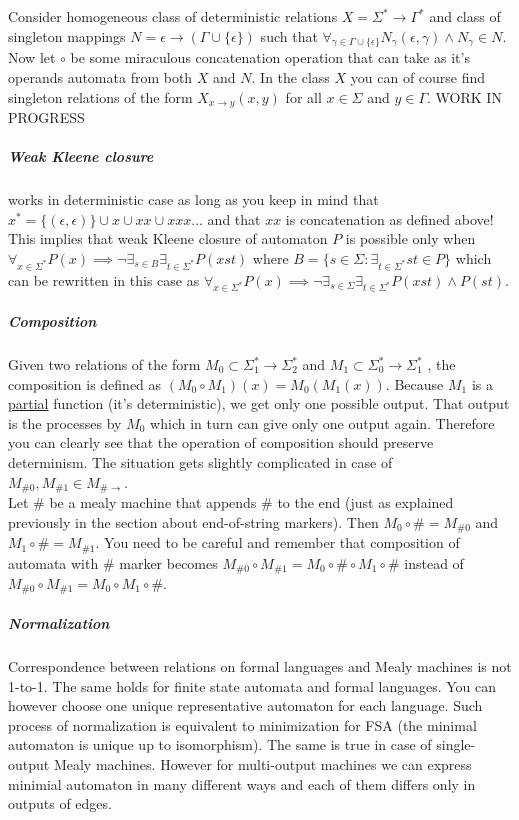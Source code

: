 \documentclass[12pt]{article}
\begin{document}
Consider homogeneous class of deterministic relations $X = \Sigma^* \rightarrow \Gamma^*$ and class of singleton mappings $N = \epsilon \rightarrow (\Gamma\cup\{\epsilon\})$ such that $\forall_{\gamma\in\Gamma\cup\{\epsilon\}}N_\gamma(\epsilon,\gamma) \wedge N_\gamma  \in N$. Now let $\circ$ be some miraculous concatenation operation that can take as it's operands automata from both $X$ and $N$. In the class $X$ you can of course find singleton relations of the form $X_{x\rightarrow y}(x,y)$ for all $x\in \Sigma$ and $y \in \Gamma$. WORK IN PROGRESS



\subparagraph{Weak Kleene closure}  works in deterministic case as long as you keep in mind that $x^* = \{(\epsilon,\epsilon) \} \cup x \cup xx \cup xxx ...$ and that $xx$ is concatenation as defined above! This implies that weak Kleene closure of automaton $P$ is possible only when $\forall_{x\in \Sigma^*} P(x) \implies \neg \exists_{s\in B} \exists_{t\in\Sigma^*} P(xst)$ where $B = \{s\in\Sigma : \exists_{t\in\Sigma^*}st\in P\}$ which can be rewritten in this case as  $\forall_{x\in \Sigma^*} P(x) \implies \neg \exists_{s\in \Sigma} \exists_{t\in\Sigma^*} P(xst) \wedge P(st)$. 

\subparagraph{Composition} Given two relations of the form $M_0 \subset \Sigma_1^* \rightarrow \Sigma_2^*$ and $M_1 \subset \Sigma_0^* \rightarrow \Sigma_1^*$ , the composition is defined as $(M_0 \circ M_1)(x) = M_0(M_1(x))$. Because $M_1$ is a \underline{partial} function (it's deterministic), we get only one possible output. That output is the processes by $M_0$ which in turn can give only one output again. Therefore you can clearly see that the operation of composition should preserve determinism. The situation gets slightly complicated in case of $M_{\#0},M_{\#1} \in M_{\#\rightarrow}$. \\
Let $\#$ be a mealy machine that appends $\#$ to the end (just as explained previously in the section about end-of-string markers). Then  $M_0 \circ \# = M_{\#0}$ and $M_1 \circ \# = M_{\#1}$. You need to be careful and remember that composition of automata with $\#$ marker becomes $M_{\#0} \circ M_{\#1} = M_0 \circ \# \circ M_1 \circ \#$ instead of  $M_{\#0} \circ M_{\#1} = M_0 \circ M_1 \circ \#$.

\subparagraph{Normalization} 
 Correspondence between relations on formal languages and Mealy machines is not 1-to-1. The same holds for finite state automata and formal languages. You can however choose one unique representative automaton for each language. Such process of normalization is equivalent to minimization for FSA (the minimal automaton is unique up to isomorphism). The same is true in case of single-output Mealy machines. However for multi-output machines we can express minimial automaton in many different ways and each of them differs only in outputs of edges. 
\end{document}
